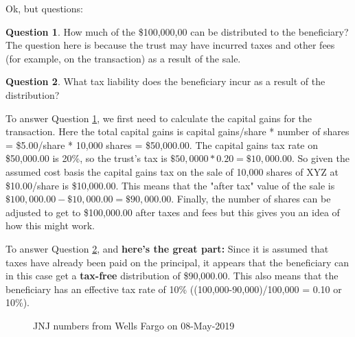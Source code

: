 \documentclass[11pt, oneside]{article}   	%
\theoremstyle{definition}
\newtheorem{question}{Question}[section]
\begin{document}
\bigskip
\noindent
Ok, but questions:

\begin{question}
How much of the \$100,000,00 can be distributed to the beneficiary? The question here is because the trust may have incurred taxes and other fees 
(for example, on the transaction) as a result of the sale.
\label{q:how_much}
\end{question}

\begin{question}
What tax liability does the beneficiary incur as a result of the distribution?
\label{q:liability}
\end{question}

\noindent
To answer Question \ref{q:how_much}, we first need to calculate the capital gains for the transaction. Here the total capital gains is 
capital gains/share * number of shares = \$5.00/share * 10,000 shares = \$50,000.00. The capital gains tax rate on \$50,000.00 is 20\%, 
so the trust's tax is $\$50,0000 * 0.20 = \$10,000.00$. So given the assumed cost basis the capital gains tax on the sale of 10,000 shares 
of XYZ at \$10.00/share is \$10,000.00. This means that the "after tax" value of the sale is $\$100,000.00 - \$10,000.00 = \$90,000.00$.
Finally, the number of shares can be adjusted to get to \$100,000.00 after taxes and fees but this gives you an idea
of how this might work.

\bigskip
\noindent
To answer Question \ref{q:liability}, and 
 \textbf{here's the great part:} Since it is assumed that taxes have already been paid on the principal, it appears that the beneficiary can in this case get a \textbf{tax-free} 
distribution of \$90,000.00. This also means that the beneficiary has an effective tax rate of 10\% ((100,000-90,000)/100,000 = 0.10 or 10\%). 

\bigskip
\noindent

\begin{figure}
\caption{JNJ numbers from Wells Fargo on 08-May-2019}
\label{fig:wfa}
\end{figure}
\end{document}
